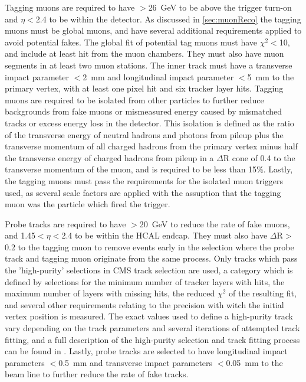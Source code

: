 Tagging muons are required to have \pt$>$\SI{26}{\giga\eV} to be above the trigger turn-on and $\eta<$2.4 to be within the detector. 
As discussed in \cref{sec:muonReco} the tagging muons must be global muons, and have several additional requirements applied to avoid potential fakes.
The global fit of potential tag muons must have $\chi^2<$10, and include at least hit from the muon chambers. 
They must also have muon segments in at least two muon stations.
The inner track must have a transverse impact parameter $<$\SI{2}{\milli\meter} and longitudinal impact parameter $<$\SI{5}{\milli\meter} to the primary vertex, with at least one pixel hit and six tracker layer hits.
Tagging muons are required to be isolated from other particles to further reduce backgrounds from fake muons or mismeasured energy caused by mismatched tracks or excess energy loss in the detector.
This isolation is defined as the ratio of the transverse energy of neutral hadrons and photons from pileup plus the transverse momentum of all charged hadrons from the primary vertex minus half the transverse energy of charged hadrons from pileup in a $\Delta$R cone of 0.4 to the transverse momentum of the muon, and is required to be less than 15$\%$.
Lastly, the tagging muons must pass the requirements for the isolated muon triggers used, as several scale factors are applied with the assuption that the tagging muon was the particle which fired the trigger.

Probe tracks are required to have \pt$>$\SI{20}{\giga\eV} to reduce the rate of fake muons, and 1.45$<\eta<$2.4 to be within the HCAL endcap.
They must also have $\Delta\mathrm{R}>$0.2 to the tagging muon to remove events early in the selection where the probe track and tagging muon originate from the same process.
Only tracks which pass the 'high-purity' selections in CMS track selection are used, a category which is defined by selections for the minimum number of tracker layers with hits, the maximum number of layers with missing hits, the reduced $\chi^2$ of the resulting fit, and several other requirements relating to the precision with witch the initial vertex position is measured.
The exact values used to define a high-purity track vary depending on the track parameters and several iterations of attempted track fitting, and a full description of the high-purity selection and track fitting process can be found in \cite{trackFitting}.
Lastly, probe tracks are selected to have longitudinal impact parameters $<$\SI{0.5}{\milli\meter} and transverse impact parameters $<$\SI{0.05}{\milli\meter} to the beam line to further reduce the rate of fake tracks.

